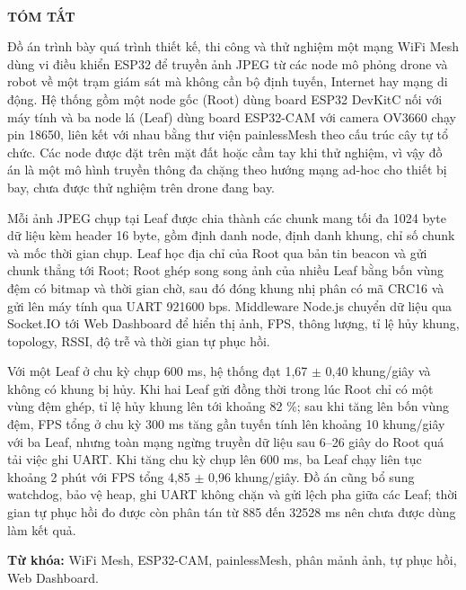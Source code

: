 \clearpage
\begin{center}
{\fontsize{16}{20}\selectfont\bfseries \tendetai\\[0.4cm] TÓM TẮT\par}
\end{center}
\vspace{0.3cm}
Đồ án trình bày quá trình thiết kế, thi công và thử nghiệm một mạng WiFi Mesh dùng vi điều khiển ESP32 để truyền ảnh JPEG từ các node mô phỏng drone và robot về một trạm giám sát mà không cần bộ định tuyến, Internet hay mạng di động. Hệ thống gồm một node gốc (Root) dùng board ESP32 DevKitC nối với máy tính và ba node lá (Leaf) dùng board ESP32-CAM với camera OV3660 chạy pin 18650, liên kết với nhau bằng thư viện painlessMesh theo cấu trúc cây tự tổ chức. Các node được đặt trên mặt đất hoặc cầm tay khi thử nghiệm, vì vậy đồ án là một mô hình truyền thông đa chặng theo hướng mạng ad-hoc cho thiết bị bay, chưa được thử nghiệm trên drone đang bay.

Mỗi ảnh JPEG chụp tại Leaf được chia thành các chunk mang tối đa 1024 byte dữ liệu kèm header 16 byte, gồm định danh node, định danh khung, chỉ số chunk và mốc thời gian chụp. Leaf học địa chỉ của Root qua bản tin beacon và gửi chunk thẳng tới Root; Root ghép song song ảnh của nhiều Leaf bằng bốn vùng đệm có bitmap và thời gian chờ, sau đó đóng khung nhị phân có mã CRC16 và gửi lên máy tính qua UART 921600 bps. Middleware Node.js chuyển dữ liệu qua Socket.IO tới Web Dashboard để hiển thị ảnh, FPS, thông lượng, tỉ lệ hủy khung, topology, RSSI, độ trễ và thời gian tự phục hồi.

Với một Leaf ở chu kỳ chụp 600 ms, hệ thống đạt 1,67 $\pm$ 0,40 khung/giây và không có khung bị hủy. Khi hai Leaf gửi đồng thời trong lúc Root chỉ có một vùng đệm ghép, tỉ lệ hủy khung lên tới khoảng 82 \%; sau khi tăng lên bốn vùng đệm, FPS tổng ở chu kỳ 300 ms tăng gần tuyến tính lên khoảng 10 khung/giây với ba Leaf, nhưng toàn mạng ngừng truyền dữ liệu sau 6–26 giây do Root quá tải việc ghi UART. Khi tăng chu kỳ chụp lên 600 ms, ba Leaf chạy liên tục khoảng 2 phút với FPS tổng 4,85 $\pm$ 0,96 khung/giây. Đồ án cũng bổ sung watchdog, bảo vệ heap, ghi UART không chặn và gửi lệch pha giữa các Leaf; thời gian tự phục hồi đo được còn phân tán từ 885 đến 32528 ms nên chưa được dùng làm kết quả.

\noindent\textbf{Từ khóa:} WiFi Mesh, ESP32-CAM, painlessMesh, phân mảnh ảnh, tự phục hồi, Web Dashboard.
